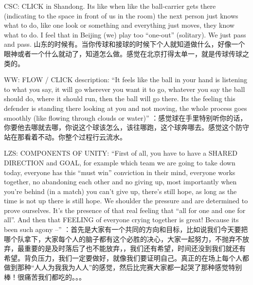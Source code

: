 \begin{CJK}{UTF8}{gbsn}
          CSC:
          CLICK in Shandong. Its like when like the ball-carrier gets there (indicating to the space in front of us in the room) the next person just knows what to do, like one look or something and everything just moves, they know what to do. I feel that in Beijing (we) play too “one-out” (solitary). We just pass and pass.	山东的时候有。当你传球和接球的时候下个人就知道做什么，好像一个眼神或者一个什么就动了，知道怎么做。感觉在北京打得太单一，就是传球传球之类的。


           WW:
           FLOW / CLICK description: “It feels like the ball in your hand is listening to what you say, it will go wherever you want it to go, whatever you say the ball should do, where it should run, then the ball will go there.  Its the feeling this defender is standing there looking at you and not moving, the whole process goes smoothly (like flowing through clouds or water)”	：感觉球在手里特别听你的话，你要他去哪就去哪，你说这个球该怎么，该往哪跑，这个球奔哪去。感觉这个防守站在那看着不动。你整个过程行云流水。

        LZS:
         COMPONENTS OF UNITY: “First of all, you have to have a SHARED DIRECTION and GOAL, for example which team we are going to take down today, everyone has this “must win” conviction in their mind, everyone works together, no abandoning each other and no giving up, most importantly when you’re behind (in a match) you can’t give up, there’s still hope, as long as the time is not up there is still hope.  We shoulder the pressure and are determined to prove ourselves.  It's the presence of that real feeling that “all for one and one for all”.  And then that FEELING of everyone crying together is great! Because its been such agony –”	：首先是大家有一个共同的方向和目标，比如说我们今天要把哪个队拿下，大家每个人的脑子都有这个必胜的决心，大家一起努力，不抛弃不放弃，最重要的是及时落后了也不能放弃，，我们还有希望，时间还没到我们就还有希望。背负压力，我们一定要做好，就像我们要证明自己。真正的在场上每个人都做到那种“人人为我我为人人”的感觉，然后比完赛大家都一起哭了那种感觉特别棒！很痛苦我们都吃的。。。







\end{CJK}
